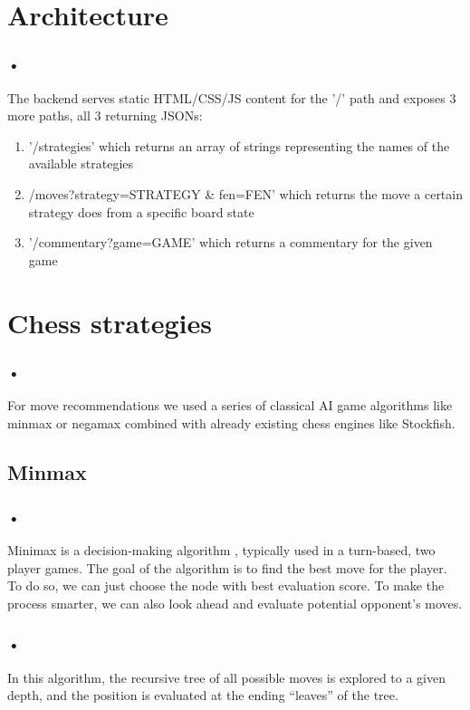 \documentclass{svproc}
\begin{document}
\section{Architecture}

\subsubsection{•}
The backend serves static HTML/CSS/JS content for the '/' path and exposes 3 more paths, all 3 returning JSONs: 

\begin{enumerate}
  \item '/strategies' which returns an array of strings representing the names of the available strategies
  \item /moves?strategy=STRATEGY \& fen=FEN' which returns the move a certain strategy does from a specific board state
  \item '/commentary?game=GAME' which returns a commentary for the given game
\end{enumerate}

\section{Chess strategies}

\subsubsection{•}
For move recommendations we used a series of classical AI game algorithms like minmax or negamax combined with already existing chess engines like Stockfish.

\subsection{Minmax}

\subsubsection{•}
Minimax is a decision-making algorithm , typically used in a turn-based, two player games. The goal of the algorithm is to find the best move for the player. To do so, we can just choose the node with best evaluation score. To make the process smarter, we can also look ahead and evaluate potential opponent’s moves.

\subsubsection{•}
In this algorithm, the recursive tree of all possible moves is explored to a given depth, and the position is evaluated at the ending “leaves” of the tree.
\end{document}
